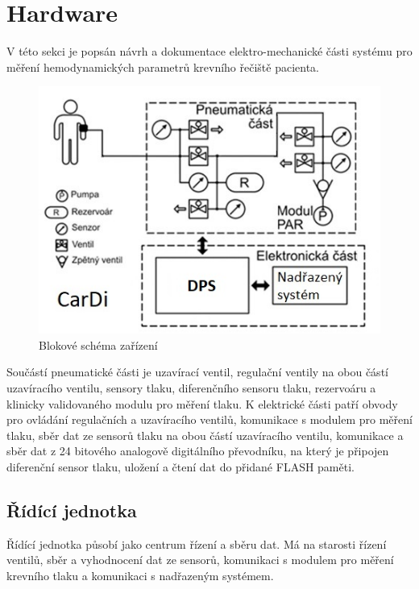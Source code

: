 \chapter{Hardware}
V této sekci je popsán návrh a dokumentace elektro-mechanické části systému pro měření hemodynamických parametrů krevního řečiště pacienta.

\begin{figure}[H]
    \label{fig:block_cardi}
    \includegraphics[width=1\textwidth]{pictures/blokove_schema_cele_zarizeni.jpg}
    \caption{Blokové schéma zařízení}
\end{figure}
Součástí pneumatické části je uzavírací ventil, regulační ventily na obou částí uzavíracího ventilu, sensory tlaku, diferenčního sensoru tlaku, rezervoáru a klinicky validovaného modulu pro měření tlaku.
K elektrické části patří obvody pro ovládání regulačních a uzavíracího ventilů, komunikace s modulem pro měření tlaku, sběr dat ze sensorů tlaku na obou částí uzavíracího ventilu, komunikace a sběr dat z 24 bitového analogově digitálního převodníku, na který je připojen diferenční sensor tlaku,
uložení a čtení dat do přidané FLASH paměti.
\section{Řídící jednotka}

Řídící jednotka působí jako centrum řízení a sběru dat.
Má na starosti řízení ventilů,
sběr a vyhodnocení dat ze sensorů, komunikaci s modulem pro měření krevního tlaku a komunikaci s nadřazeným systémem. \par

